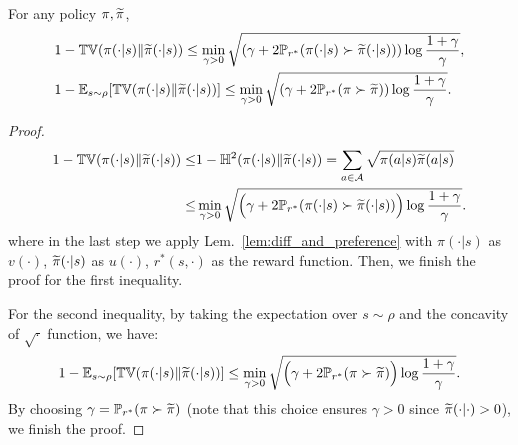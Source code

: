 \begin{lemma}\label{lem:TV_to_Preference}
    For any policy $\pi, \widetilde{\pi}$,
    \begin{align*}
        &1 - \mathbb{TV}(\pi(\cdot|s)\|\widetilde{\pi}(\cdot|s)) \leq \min_{\gamma > 0} \sqrt{(\gamma + 2{\mathbb{P}}_{r^*}(\pi(\cdot|s) \succ \widetilde{\pi}(\cdot|s))) \log \frac{1 + \gamma}{\gamma}},\\
        &1 - \mathbb{E}_{s\sim\rho}[\mathbb{TV}(\pi(\cdot|s)\|\widetilde{\pi}(\cdot|s))] \leq \min_{\gamma > 0} \sqrt{(\gamma + 2 {\mathbb{P}}_{r^*}(\pi\succ \widetilde{\pi})) \log \frac{1 + \gamma}{\gamma}}.
    \end{align*}
\end{lemma}
\begin{proof}
    \begin{align*}
        1 - \mathbb{TV}(\pi(\cdot|s)\|\widetilde{\pi}(\cdot|s)) \leq & 1 - \mathbb{H}^2(\pi(\cdot|s)\|\widetilde{\pi}(\cdot|s)) = \sum_{a\in\mathcal{A}} \sqrt{\pi(a|s) \widetilde{\pi}(a|s)} \\
        \leq & \min_{\gamma > 0}\sqrt{\Big(\gamma + 2 {\mathbb{P}}_{r^*}(\pi(\cdot|s) \succ \widetilde{\pi}(\cdot|s)) \Big)\log\frac{1+\gamma}{\gamma}}.
    \end{align*}
    where in the last step we apply Lem.~\ref{lem:diff_and_preference} with $\pi(\cdot|s)$ as $v(\cdot)$, $\widetilde{\pi}(\cdot|s)$ as $u(\cdot)$, $r^*(s,\cdot)$ as the reward function.
    Then, we finish the proof for the first inequality.

    For the second inequality, by taking the expectation over $s\sim\rho$ and the concavity of $\sqrt{\cdot}$ function, we have:
    \begin{align*}
        1 - \mathbb{E}_{s\sim\rho}[\mathbb{TV}(\pi(\cdot|s)\|\widetilde{\pi}(\cdot|s))] \leq \min_{\gamma > 0}\sqrt{\Big(\gamma + 2{\mathbb{P}}_{r^*}(\pi\succ\widetilde{\pi})\Big) \log\frac{1 + \gamma}{\gamma}}.
    \end{align*}
    By choosing $\gamma = {\mathbb{P}}_{r^*}(\pi\succ\widetilde{\pi})$ (note that this choice ensures $\gamma > 0$ since $\widetilde{\pi}(\cdot|\cdot) > 0$), we finish the proof.
\end{proof}

